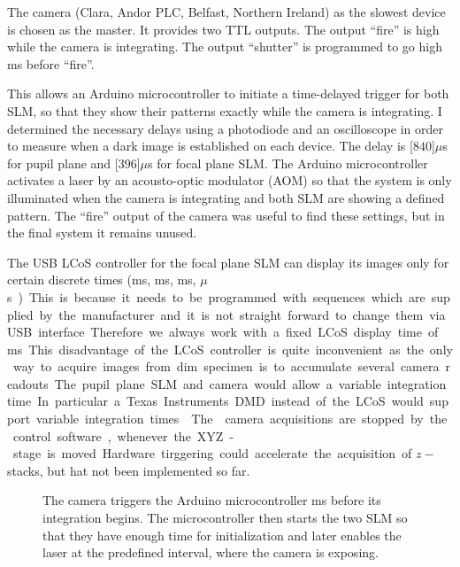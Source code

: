 The camera (Clara, Andor PLC, Belfast, Northern Ireland) as the
 slowest device is chosen as the master. It
provides two TTL outputs. The output ``fire'' is high while the camera
is integrating. The output ``shutter'' is programmed to go high
\unit[1]{ms} before ``fire''.

This allows an Arduino microcontroller to initiate a time-delayed
trigger for both SLM, so that they show their patterns exactly while
the camera is integrating. I determined the necessary delays using a
photodiode and an oscilloscope in order to measure when a dark image
is established on each device. The delay is \unit[$840$]{$\mu$s} for
pupil plane and \unit[$396$]{$\mu$s} for focal plane SLM. The Arduino
microcontroller activates a laser by an acousto-optic modulator (AOM)
so that the system is only illuminated when the camera is integrating
and both SLM are showing a defined pattern.  The ``fire'' output of
the camera was useful to find these settings, but in the final system
it remains unused.



The  USB LCoS controller for the
focal plane SLM can display its images only for certain discrete times
(\unit[20]{ms}, \unit[10]{ms}, \unit[5]{ms}, \unit[200]{$\mu$s}).
This is because it needs to be programmed with sequences which are
supplied by the manufacturer and it is not straight forward to change
them via USB interface. Therefore we always work with a fixed LCoS
display time of \unit[20]{ms}.

This disadvantage of the LCoS controller is quite inconvenient as the
only way to acquire images from dim specimen is to accumulate several
camera readouts.  The pupil plane SLM and camera would allow a
variable integration time. In particular a Texas Instruments DMD
instead of the LCoS would support variable integration times
\citep{Guide2012}.


The  camera acquisitions are stopped
by the control software, whenever the XYZ-stage is moved. Hardware
tirggering could accelerate the acquisition of $z-$stacks, but hat not
been implemented so far.

\begin{figure}[H]
 \centering
 \caption{The camera triggers the Arduino microcontroller \unit[1]{ms}
   before its integration begins. The microcontroller then starts the
   two SLM so that they have enough time for initialization and later
   enables the laser at the predefined interval, where the camera is
   exposing.}
 \label{fig:memi-electronics}
\end{figure}






